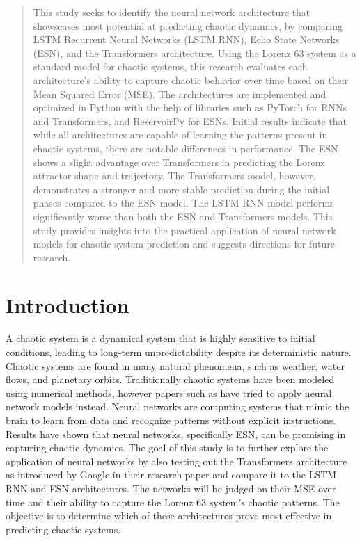 \documentclass[11pt]{article}
\title{}
\author{Sebastian M.D.}
\date{March 2024}
\begin{document}
\maketitle
\thispagestyle{empty} %

\newpage
\null{}
\begin{abstract}
    \noindent This study seeks to identify the neural network architecture that showscases most potential at predicting chaotic dynamics, by comparing LSTM Recurrent Neural Networks (LSTM RNN), Echo State Networks (ESN), and the Transformers architecture. Using the Lorenz 63 system as a standard model for chaotic systems, this research evaluates each architecture's ability to capture chaotic behavior over time based on their Mean Squared Error (MSE). The architectures are implemented and optimized in Python with the help of libraries such as PyTorch for RNNs and Transformers, and ReservoirPy for ESNs. Initial results indicate that while all architectures are capable of learning the patterns present in chaotic systems, there are notable differences in performance. The ESN shows a slight advantage over Transformers in predicting the Lorenz attractor shape and trajectory. The Transformers model, however, demonstrates a stronger and more stable prediction during the initial phases compared to the ESN model. The LSTM RNN model performs significantly worse than both the ESN and Transformers models. This study provides insights into the practical application of neural network models for chaotic system prediction and suggests directions for future research.
\end{abstract}
\newpage


\tableofcontents
\newpage

\section{Introduction}
A chaotic system is a dynamical system that is highly sensitive to initial conditions, leading to long-term unpredictability despite its deterministic nature. Chaotic systems are found in many natural phenomena, such as weather, water flows, and planetary orbits. Traditionally chaotic systems have been modeled using numerical methods, however papers such as \cite{npg-27-373-2020} have tried to apply neural network models instead. Neural networks are computing systems that mimic the brain to learn from data and recognize patterns without explicit instructions. Results have shown that neural networks, specifically ESN, can be promising in capturing chaotic dynamics. The goal of this study is to further explore the application of neural networks by also testing out the Transformers architecture as introduced by Google in their research paper \cite{DBLP:journals/corr/VaswaniSPUJGKP17} and compare it to the LSTM RNN and ESN architectures. The networks will be judged on their MSE over time and their ability to capture the Lorenz 63 system's chaotic patterns. The objective is to determine which of these architectures prove most effective in predicting chaotic systems.
\end{document}
